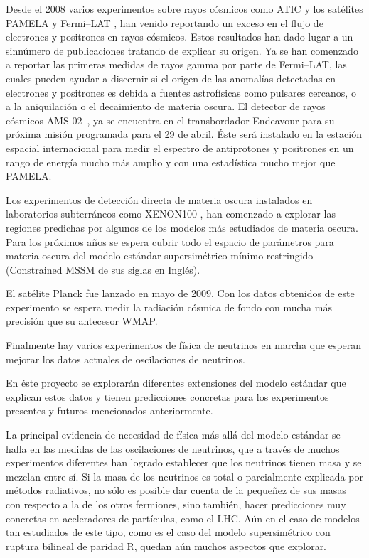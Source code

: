Desde el 2008 varios experimentos sobre rayos cósmicos como ATIC
\cite{:2008zzr} y los satélites PAMELA \cite{Adriani:2008zr} y
Fermi--LAT \cite{Abdo:2009zk}, han venido reportando un exceso en el
flujo de electrones y positrones en rayos cósmicos. Estos resultados
han dado lugar a un sinnúmero de publicaciones tratando de explicar su
origen. Ya se han comenzado a reportar las primeras medidas de rayos
gamma por parte de Fermi--LAT, las cuales pueden ayudar a discernir si
el origen de las anomalías detectadas en electrones y positrones es
debida a fuentes astrofísicas como pulsares cercanos, o a la
aniquilación o el decaimiento de materia oscura. El detector de rayos
cósmicos AMS-02~\cite{ams:2009}, ya se encuentra en el transbordador
Endeavour para su próxima misión programada para el 29 de abril. Éste
será instalado en la estación espacial internacional para medir el
espectro de antiprotones y positrones en un rango de energía mucho más
amplio y con una estadística mucho mejor que PAMELA.


Los experimentos de detección directa de materia oscura instalados en
laboratorios subterráneos como XENON100 \cite{Aprile:2011ts}, han
comenzado a explorar las regiones predichas por algunos de los modelos
más estudiados de materia oscura. Para los próximos años se espera
cubrir todo el espacio de parámetros para materia oscura del modelo
estándar supersimétrico mínimo restringido (Constrained MSSM de sus
siglas en Inglés).

El satélite Planck fue lanzado en mayo de 2009.  Con los datos
obtenidos de este experimento se espera medir la radiación cósmica de
fondo con mucha más precisión que su antecesor WMAP.

Finalmente hay varios experimentos de física de neutrinos en marcha
que esperan mejorar los datos actuales de oscilaciones de neutrinos.


En éste proyecto se explorarán diferentes extensiones del modelo
estándar que explican estos datos y tienen predicciones
concretas para los experimentos presentes y futuros mencionados
anteriormente.

La principal evidencia de necesidad de física más allá del modelo
estándar se halla en las medidas de las oscilaciones de neutrinos, que
a través de muchos experimentos diferentes han logrado establecer que
los neutrinos tienen masa y se mezclan entre sí. Si la masa de los
neutrinos es total o parcialmente explicada por métodos radiativos, no
sólo es posible dar cuenta de la pequeñez de sus masas con respecto a
la de los otros fermiones, sino también, hacer predicciones muy
concretas en aceleradores de partículas, como el LHC. Aún en el caso
de modelos tan estudiados de este tipo, como es el caso del modelo
supersimétrico con ruptura bilineal de paridad R, quedan aún muchos
aspectos que explorar.

